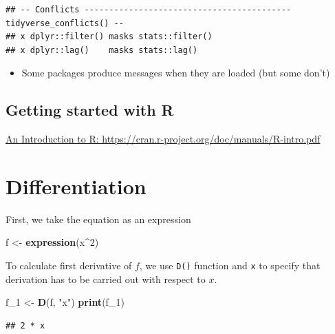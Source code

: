 \documentclass[]{book}
\newenvironment{Shaded}{\begin{snugshade}}{\end{snugshade}}
\newcommand{\DecValTok}[1]{\textcolor[rgb]{0.00,0.00,0.81}{#1}}
\newcommand{\KeywordTok}[1]{\textcolor[rgb]{0.13,0.29,0.53}{\textbf{#1}}}
\newcommand{\NormalTok}[1]{#1}
\newcommand{\OperatorTok}[1]{\textcolor[rgb]{0.81,0.36,0.00}{\textbf{#1}}}
\newcommand{\StringTok}[1]{\textcolor[rgb]{0.31,0.60,0.02}{#1}}
\providecommand{\tightlist}{%
  \setlength{\itemsep}{0pt}\setlength{\parskip}{0pt}}
\begin{document}
\begin{verbatim}
## -- Conflicts ------------------------------------------ tidyverse_conflicts() --
## x dplyr::filter() masks stats::filter()
## x dplyr::lag()    masks stats::lag()
\end{verbatim}

\begin{itemize}
\tightlist
\item
  Some packages produce messages when they are loaded (but some don't)
\end{itemize}

\hypertarget{getting-started-with-r}{%
\section{Getting started with R}\label{getting-started-with-r}}

\href{https://cran.r-project.org/doc/manuals/R-intro.pdf}{An Introduction to R: https://cran.r-project.org/doc/manuals/R-intro.pdf}

\hypertarget{differentiation}{%
\chapter{Differentiation}\label{differentiation}}

First, we take the equation as an expression

\begin{Shaded}
\begin{Highlighting}[]
\NormalTok{f <-}\StringTok{ }\KeywordTok{expression}\NormalTok{(x}\OperatorTok{^}\DecValTok{2}\NormalTok{)}
\end{Highlighting}
\end{Shaded}

To calculate first derivative of \(f\), we use \texttt{D()} function and \texttt{x} to specify that derivation has to be carried out with respect to
\(x\).

\begin{Shaded}
\begin{Highlighting}[]
\NormalTok{f_}\DecValTok{1}\NormalTok{ <-}\StringTok{ }\KeywordTok{D}\NormalTok{(f, }\StringTok{"x"}\NormalTok{)}
\KeywordTok{print}\NormalTok{(f_}\DecValTok{1}\NormalTok{)}
\end{Highlighting}
\end{Shaded}

\begin{verbatim}
## 2 * x
\end{verbatim}
\end{document}
